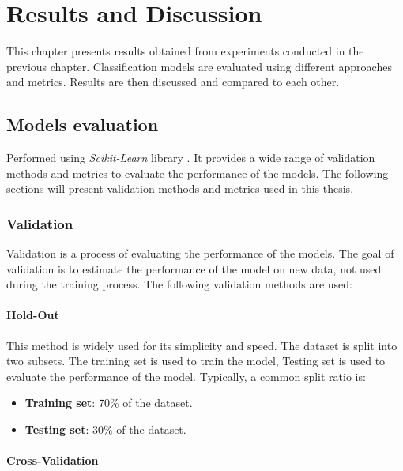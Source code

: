 \hypersetup{colorlinks=true, linkcolor=blue, citecolor=red}

\chapter{Results and Discussion} \label{chap:results_and_discussion}

    This chapter presents results obtained from experiments conducted in the previous chapter. Classification models are evaluated using different approaches and metrics. Results are then discussed and compared to each other.

    \section{Models evaluation}

        Performed using \textit{Scikit-Learn} library \cite{sklearn_api}. It provides a wide range of validation methods and metrics to evaluate the performance of the models. The following sections will present validation methods and metrics used in this thesis.

        \subsection{Validation}

            Validation is a process of evaluating the performance of the models. The goal of validation is to estimate the performance of the model on new data, not used during the training process. The following validation methods are used:

            \subsubsection{Hold-Out}

                This method is widely used for its simplicity and speed. The dataset is split into two subsets. The training set is used to train the model, Testing set is used to evaluate the performance of the model. Typically, a common split ratio is:
                \begin{itemize}
                    \item \textbf{Training set}: 70\% of the dataset.
                    \item \textbf{Testing set}: 30\% of the dataset.
                \end{itemize}
            
            \subsubsection{Cross-Validation}
                
